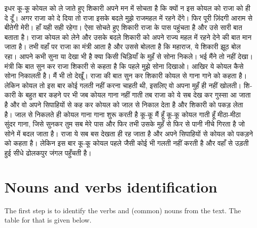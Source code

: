 \documentclass{article}
\begin{document}
\begin{hindi}
इधर कू-कू कोयल को ले जाते हुए शिकारी अपने मन में सोचता है कि क्यों न इस कोयल को राजा को ही दे दूँ। अगर राजा को दे दिया तो राजा इसके बदले मुझे राजमहल में रहने देंगे। फिर पूरी ज़िंदगी आराम से बीतेगी मेरी। हाँ यही सही रहेगा। ऐसा सोचते हुए शिकारी राजा के पास पहुंचता है और उसे सारी बात बताता है। राजा कोयल को लेने और उसके बदले शिकारी को अपने राज्य महल में रहने देने की बात मान जाता है। तभी वहाँ पर राजा का मंत्री आता है और उससे बोलता है कि महाराज, ये शिकारी झूठ बोल रहा। आपने कभी सुना या देखा भी है क्या किसी चिड़ियाँ के मुहँ से सोना निकले। भई मैंने तो नहीं देखा। मंत्री कि बात सुन कर राजा शिकारी से कहता है कि पहले मुझे सोना दिखाओ। आखिर ये कोयल कैसे सोना निकालती है। मैं भी तो देखूँ। राजा की बात सुन कर शिकारी कोयल से गाना गाने को कहता है। लेकिन कोयल तो इस बार कोई गलती नहीं करना चाहती थी, इसलिए वो अपना मुहँ ही नहीं खोलती। शिकारी के बहुत बार कहने पर भी जब कोयल गाना नहीं गाती तब राजा को ये सब देख कर गुस्सा आ जाता है और वो अपने सिपाहियों से कह कर कोयल को जाल से निकाल देता है और शिकारी को पकड़ लेता है। जाल से निकलते ही कोयल गाना गाना शुरू करती है कू-कू मैं हूँ कू-कू कोयल गाती हूँ मीठा-मीठा सुंदर गाना, जिसे सुनकर तुम सब मेरे पास और फिर तभी उसके मुहँ से फिर से पानी नीचे गिरता है जो सोने में बदल जाता है। राजा ये सब बस देखता ही रह जाता है और अपने सिपाहियों से कोयल को पकड़ने को कहता है। लेकिन इस बार कू-कू कोयल पहले जैसी कोई भी गलती नहीं करती है और वहाँ से उड़ती हुई सीधे ढोलकपुर जंगल पहुँचती है।    
\end{hindi}

\section{Nouns and verbs identification}
The first step is to identify the verbs and (common) nouns from the text. 
The table for that is given below.
\end{document}
